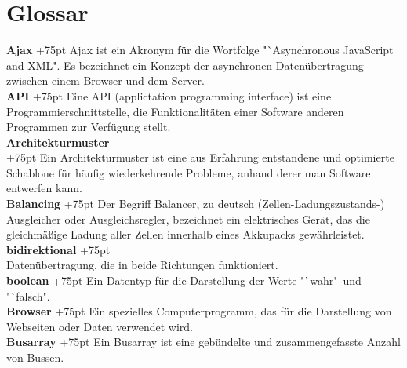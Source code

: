 \documentclass[fontsize = 12pt, paper = a4]{scrreprt}
\begin{document}

\chapter*{Glossar}

\textbf{Ajax}
\hangindent+75pt 
\hspace*{13.5mm}
Ajax ist ein Akronym für die Wortfolge "`Asynchronous JavaScript and XML". Es bezeichnet ein Konzept der asynchronen Datenübertragung zwischen einem Browser und dem Server.\\

\textbf{API}
\hangindent+75pt 
\hspace*{13.5mm}
Eine API (applictation programming interface) ist eine Programmierschnittstelle, die Funktionalitäten einer Software anderen Programmen zur Verfügung stellt.\\

\textbf{Architekturmuster} \\
\hangindent+75pt  
Ein Architekturmuster ist eine aus Erfahrung entstandene und optimierte Schablone für häufig wiederkehrende Probleme, anhand derer man Software entwerfen kann.\\

\textbf{Balancing}
\hangindent+75pt 
\hspace*{3.5mm}
Der Begriff Balancer, zu deutsch (Zellen-Ladungszustands-) Ausgleicher oder Ausgleichsregler, bezeichnet ein elektrisches Gerät, das die gleichmäßige Ladung aller Zellen innerhalb eines Akkupacks gewährleistet.\\

\textbf{bidirektional}
\hangindent+75pt  \\
Datenübertragung, die in beide Richtungen funktioniert. \\

\textbf{boolean}
\hangindent+75pt  
\hspace*{7.5mm}
Ein Datentyp für die Darstellung der Werte "`wahr"\ und "`falsch".\\

\textbf{Browser}
\hangindent+75pt 
\hspace*{6.5mm}
Ein spezielles Computerprogramm, das für die Darstellung von Webseiten oder Daten verwendet wird.\\

\textbf{Busarray}
\hangindent+75pt 
\hspace*{5.5mm} 
Ein Busarray ist eine gebündelte und zusammengefasste Anzahl von Bussen.\\
\end{document}
